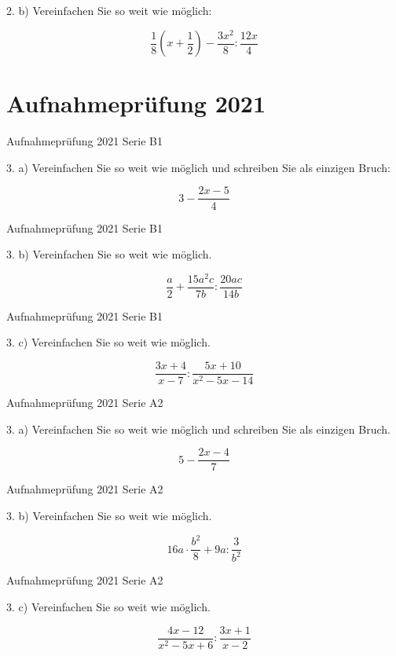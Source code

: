 2. b) Vereinfachen Sie so weit wie möglich:

$$\frac18\left(x+\frac12\right)  - \frac{3x^2}{8} : \frac{12x}{4}$$

\section*{Aufnahmeprüfung 2021}
Aufnahmeprüfung 2021 Serie B1

3. a) Vereinfachen Sie so weit wie möglich und schreiben Sie als
einzigen Bruch:

$$3-\frac{2x-5}{4}$$

Aufnahmeprüfung 2021 Serie B1

3. b) Vereinfachen Sie so weit wie möglich.

$$\frac{a}2 + \frac{15a^2c}{7b} : \frac{20ac}{14b}$$

Aufnahmeprüfung 2021 Serie B1

3. c) Vereinfachen Sie so weit wie möglich.

$$\frac{3x+4}{x-7} : \frac{5x+10}{x^2-5x-14}$$

Aufnahmeprüfung 2021 Serie A2

3. a) Vereinfachen Sie so weit wie möglich und schreiben Sie als
einzigen Bruch.

$$5-\frac{2x-4}{7}$$

Aufnahmeprüfung 2021 Serie A2

3. b) Vereinfachen Sie so weit wie möglich.

$$16a\cdot{}\frac{b^2}{8} + 9a : \frac{3}{b^2}$$

Aufnahmeprüfung 2021 Serie A2

3. c) Vereinfachen Sie so weit wie möglich.

$$\frac{4x-12}{x^2-5x+6} : \frac{3x+1}{x-2}$$

